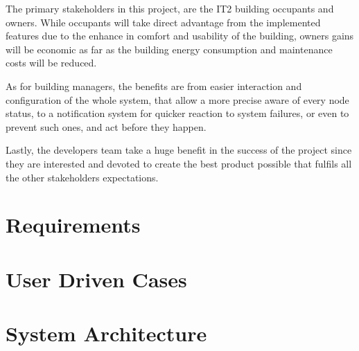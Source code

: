 The primary stakeholders in this project, are the IT2 building occupants and owners. While occupants will take direct advantage from the implemented features due to the enhance in comfort and usability of the building, owners gains will be economic as far as the building energy consumption and maintenance costs will be reduced.

As for building managers, the benefits are from easier interaction and configuration of the whole system, that allow a more precise aware of every node status, to a notification system for quicker reaction to system failures, or even to prevent such ones, and act before they happen.

Lastly, the developers team take a huge benefit in the success of the project since they are interested and devoted to create the best product possible that fulfils all the other stakeholders expectations.


\section{Requirements}
\label{Architecture:Requirements}



\section{User Driven Cases}
\label{Architecture:usecases}

\section{System Architecture}
\label{Architecture:Architecture}



